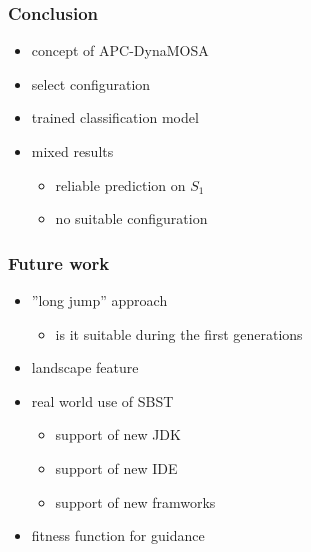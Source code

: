 
\begin{frame}
	\frametitle{Conclusion}

	\begin{itemize}
		\item concept of APC-DynaMOSA
		\item select configuration
		\item trained classification model
		\item mixed results
		\begin{itemize}
			\item reliable prediction on $S_1$
			\item no suitable configuration
		\end{itemize}
	\end{itemize}
	
\end{frame}

\begin{frame}
	\frametitle{Future work}

	\begin{itemize}
		\item ''long jump'' approach
		\begin{itemize}
			\item is it suitable during the first generations
		\end{itemize}
		\item landscape feature
		\item real world use of SBST
		\begin{itemize}
			\item support of new JDK
			\item support of new IDE
			\item support of new framworks
		\end{itemize}
		\item fitness function for guidance
	\end{itemize}
	
\end{frame}